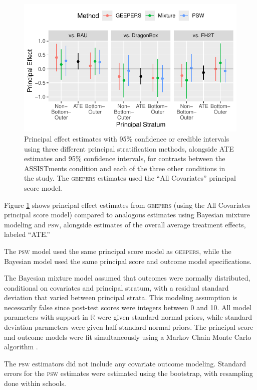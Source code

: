 \documentclass[]{article}
\begin{document}
\begin{figure}
  \centering
  \includegraphics{figure/compareMethods.pdf}
  \caption{Principal effect estimates with 95\% confidence or credible intervals using three different principal stratification methods, alongside ATE estimates and 95\% confidence intervals, for contrasts between the ASSISTments condition and each of the three other conditions in the study. The \textsc{geepers} estimates used the ``All Covariates'' principal score model.}
  \label{fig:compare}
\end{figure}

Figure \ref{fig:compare} shows principal effect estimates from \textsc{geepers} (using the All Covariates principal score model) compared to analogous estimates using Bayesian mixture modeling and \textsc{psw}, alongside estimates of the overall average treatment effects, labeled ``ATE.''

The \textsc{psw} model used the same principal score model as \textsc{geepers}, while the Bayesian model used the same principal score and outcome model specifications.

The Bayesian mixture model assumed that outcomes were normally distributed, conditional on covariates and principal stratum, with a residual standard deviation that varied between principal strata. This modeling assumption is necessarily false since post-test scores were integers between 0 and 10. All model parameters with support in $\mathbb{R}$ were given standard normal priors, while standard deviation parameters were given half-standard normal priors.
The principal score and outcome models were fit simultaneously using a Markov Chain Monte Carlo algorithm \citep{rstan}.

The \textsc{psw} estimators did not include any covariate outcome modeling. Standard errors for the \textsc{psw} estimates were estimated using the bootstrap, with resampling done within schools.
\end{document}

